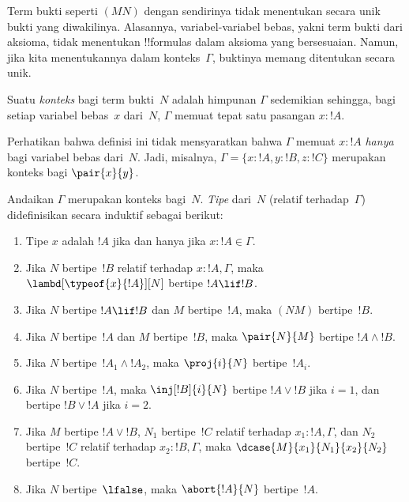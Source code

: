 \documentclass[../../../include/open-logic-section]{subfiles}
\begin{document}


Term bukti seperti $(MN)$ dengan sendirinya tidak menentukan secara unik
bukti yang diwakilinya. Alasannya, variabel-variabel bebas, yakni term bukti
dari aksioma, tidak menentukan !!{formula}s dalam aksioma yang bersesuaian.
Namun, jika kita menentukannya dalam konteks~$\Gamma$, buktinya memang
ditentukan secara unik.

\begin{defn}
Suatu \emph{konteks} bagi term bukti~$N$ adalah himpunan $\Gamma$ sedemikian
sehingga, bagi setiap variabel bebas~$x$ dari~$N$, $\Gamma$ memuat tepat satu
pasangan $x:!A$.
\end{defn}

Perhatikan bahwa definisi ini tidak mensyaratkan bahwa $\Gamma$ memuat
$x:!A$ \emph{hanya} bagi variabel bebas dari~$N$. Jadi, misalnya,
$\Gamma=\{x:!A,y:!B,z:!C\}$ merupakan konteks bagi $\pair{x}{y}$.

\begin{defn}
  Andaikan $\Gamma$ merupakan konteks bagi~$N$. \emph{Tipe} dari~$N$
  (relatif terhadap~$\Gamma$) didefinisikan secara induktif sebagai berikut:
  \begin{enumerate}
  \item Tipe $x$ adalah $!A$ jika dan hanya jika $x:!A \in \Gamma$.
  \item Jika $N$ bertipe~$!B$ relatif terhadap $x:!A,\Gamma$, maka
    $\lambd[\typeof{x}{!A}][N]$ bertipe $!A \lif !B$.
  \item Jika $N$ bertipe $!A \lif !B$ dan $M$ bertipe~$!A$, maka $(NM)$
    bertipe~$!B$.
  \item Jika $N$ bertipe~$!A$ dan $M$ bertipe~$!B$, maka $\pair{N}{M}$
    bertipe $!A \land !B$.
  \item Jika $N$ bertipe~$!A_1 \land !A_2$, maka $\proj{i}{N}$ bertipe~$!A_i$.
  \item Jika $N$ bertipe~$!A$, maka $\inj[!B]{i}{N}$ bertipe
    $!A \lor !B$ jika $i=1$, dan bertipe $!B \lor !A$ jika $i=2$.
  \item Jika $M$ bertipe $!A \lor !B$, $N_1$ bertipe~$!C$ relatif terhadap
    $x_1:!A,\Gamma$, dan $N_2$ bertipe~$!C$ relatif terhadap
    $x_2:!B,\Gamma$, maka $\dcase{M}{x_1}{N_1}{x_2}{N_2}$ bertipe~$!C$.
  \item Jika $N$ bertipe~$\lfalse$, maka $\abort{!A}{N}$ bertipe~$!A$.
  \end{enumerate}
\end{defn}
\end{document}
